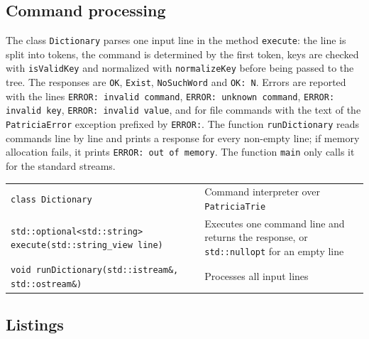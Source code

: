 \subsection{Command processing}

The class \texttt{Dictionary} parses one input line in the method \texttt{execute}: the line is
split into tokens, the command is determined by the first token, keys are checked with
\texttt{isValidKey} and normalized with \texttt{normalizeKey} before being passed to the tree. The
responses are \texttt{OK}, \texttt{Exist}, \texttt{NoSuchWord} and \texttt{OK: N}. Errors are
reported with the lines \texttt{ERROR: invalid command}, \texttt{ERROR: unknown command},
\texttt{ERROR: invalid key}, \texttt{ERROR: invalid value}, and for file commands with the text of
the \texttt{PatriciaError} exception prefixed by \texttt{ERROR:}. The function
\texttt{runDictionary} reads commands line by line and prints a response for every non-empty
line; if memory allocation fails, it prints \texttt{ERROR: out of memory}. The function
\texttt{main} only calls it for the standard streams.

\begin{table}[!ht]
\centering
\begin{tabular}{|P{7.5cm}|P{7.5cm}|}
\hline
{}
 \\
\hline
\texttt{class Dictionary} & Command interpreter over \texttt{PatriciaTrie} \\
\hline
\texttt{std::optional<std::string> execute(std::string\_view line)} & Executes one command line and returns the response, or \texttt{std::nullopt} for an empty line \\
\hline
\texttt{void runDictionary(std::istream\&, std::ostream\&)} & Processes all input lines \\
\hline
\end{tabular}
\end{table}

\subsection{Listings}







